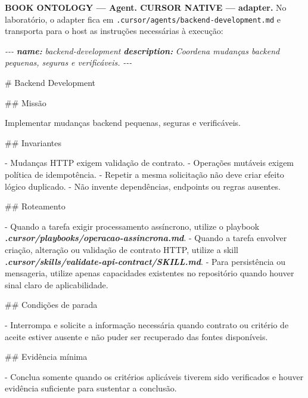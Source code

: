 \documentclass[
  10pt,
  a4paper,
  oneside]{book}
\newenvironment{Shaded}{}{}
\newcommand{\AnnotationTok}[1]{\textcolor[rgb]{0.38,0.63,0.69}{\textbf{\textit{#1}}}}
\newcommand{\CommentTok}[1]{\textcolor[rgb]{0.38,0.63,0.69}{\textit{#1}}}
\newcommand{\FunctionTok}[1]{\textcolor[rgb]{0.02,0.16,0.49}{#1}}
\newcommand{\InformationTok}[1]{\textcolor[rgb]{0.38,0.63,0.69}{\textbf{\textit{#1}}}}
\newcommand{\NormalTok}[1]{#1}
\newcommand{\SpecialStringTok}[1]{\textcolor[rgb]{0.73,0.40,0.53}{#1}}
\renewenvironment{Shaded}{\begin{snugshade}}{\end{snugshade}}%
\begin{document}
\textbf{BOOK ONTOLOGY --- Agent. CURSOR NATIVE --- adapter.} No
laboratório, o adapter fica em
\texttt{.cursor/agents/backend-development.md} e transporta para o host
as instruções necessárias à execução:

\begin{Shaded}
\begin{Highlighting}[]
\CommentTok{{-}{-}{-}}
\AnnotationTok{name:}\CommentTok{ backend{-}development}
\AnnotationTok{description:}\CommentTok{ Coordena mudanças backend pequenas, seguras e verificáveis.}
\CommentTok{{-}{-}{-}}

\FunctionTok{\# Backend Development}

\FunctionTok{\#\# Missão}

\NormalTok{Implementar mudanças backend pequenas, seguras e verificáveis.}

\FunctionTok{\#\# Invariantes}

\SpecialStringTok{{-} }\NormalTok{Mudanças HTTP exigem validação de contrato.}
\SpecialStringTok{{-} }\NormalTok{Operações mutáveis exigem política de idempotência.}
\SpecialStringTok{{-} }\NormalTok{Repetir a mesma solicitação não deve criar efeito lógico duplicado.}
\SpecialStringTok{{-} }\NormalTok{Não invente dependências, endpoints ou regras ausentes.}

\FunctionTok{\#\# Roteamento}

\SpecialStringTok{{-} }\NormalTok{Quando a tarefa exigir processamento assíncrono, utilize o playbook }\InformationTok{\textasciigrave{}.cursor/playbooks/operacao{-}assincrona.md\textasciigrave{}}\NormalTok{.}
\SpecialStringTok{{-} }\NormalTok{Quando a tarefa envolver criação, alteração ou validação de contrato HTTP, utilize a skill }\InformationTok{\textasciigrave{}.cursor/skills/validate{-}api{-}contract/SKILL.md\textasciigrave{}}\NormalTok{.}
\SpecialStringTok{{-} }\NormalTok{Para persistência ou mensageria, utilize apenas capacidades existentes no repositório quando houver sinal claro de aplicabilidade.}

\FunctionTok{\#\# Condições de parada}

\SpecialStringTok{{-} }\NormalTok{Interrompa e solicite a informação necessária quando contrato ou critério de aceite estiver ausente e não puder ser recuperado das fontes disponíveis.}

\FunctionTok{\#\# Evidência mínima}

\SpecialStringTok{{-} }\NormalTok{Conclua somente quando os critérios aplicáveis tiverem sido verificados e houver evidência suficiente para sustentar a conclusão.}
\end{Highlighting}
\end{Shaded}
\end{document}
